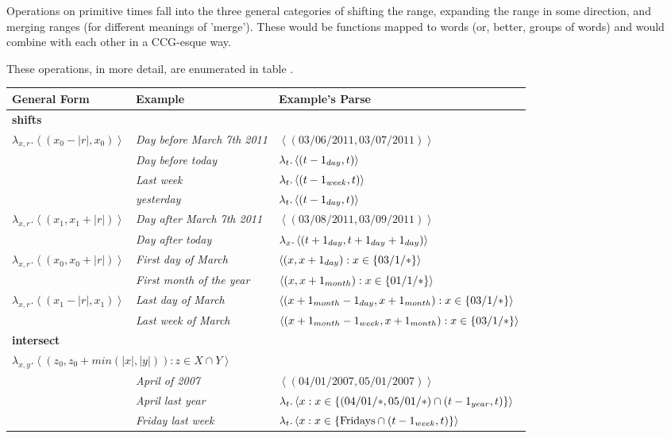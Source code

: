 \documentclass{article}
\begin{document}
Operations on primitive times fall into the three general categories
	of shifting the range, expanding the range in some direction,
	and merging ranges (for different meanings of 'merge').
These would be functions mapped to words (or, better, groups of words)
	and would combine with each other in a CCG-esque way.

These operations, in more detail, are enumerated in table .

\begin{table}
\begin{center}
\begin{tabular}{l l l}
	{\bf General Form} & {\bf Example} & {\bf Example's Parse} \\
	\hline
	\hline

	\multicolumn{3}{l}{{\bf shifts}} \\
	$\lambda_{x,r}.\left< (x_0-|r|, x_0) \right>$
		& {\em Day before March 7th 2011} 
			& $\left< (03/06/2011,03/07/2011) \right>$\\
		& {\em Day before today} 
			& $\lambda_{t}.\left< (t-1_{day},t) \right>$\\
		& {\em Last week} 
			& $\lambda_t.\left< (t-1_{week},t) \right>$ \\
		& {\em yesterday} 
			& $\lambda_t.\left< (t-1_{day},t) \right>$ \\
	$\lambda_{x,r}.\left< (x_1, x_1+|r|) \right>$
		& {\em Day after March 7th 2011} 
			& $\left< (03/08/2011,03/09/2011) \right>$\\
		& {\em Day after today} 
			& $\lambda_{x}.\left< (t+1_{day},t+1_{day}+1_{day}) \right>$\\
	
	$\lambda_{x,r}.\left< (x_0, x_0+|r|) \right>$
		& {\em First day of March} 
			& $\left< (x,x+1_{day}) : x \in \{ 03/1/* \} \right>$ \\
		& {\em First month of the year} 
			& $\left< (x,x+1_{month}) : x \in \{ 01/1/* \} \right>$ \\
	$\lambda_{x,r}.\left< (x_1-|r|, x_1) \right>$
		& {\em Last day of March} 
			& $\left< (x+1_{month}-1_{day},x+1_{month}) 
				: x \in \{ 03/1/* \} \right>$ \\
		& {\em Last week of March} 
			& $\left< (x+1_{month}-1_{week},x+1_{month}) 
				: x \in \{ 03/1/* \} \right>$ \\
	
	\multicolumn{3}{l}{{\bf intersect}} \\
	\multicolumn{3}{l}{
			$\lambda_{x,y}.\left< (z_0, z_0+min(|x|,|y|)) : z \in X \cap Y \right>$}\\
		& {\em April of 2007} 
			& $\left< (04/01/2007,05/01/2007) \right>$ \\
		& {\em April last year} 
			& $\lambda_t.\left< x 
			  : x \in \{ (04/01/*,05/01/*) \cap (t-1_{year},t) \} \right>$ \\
		& {\em Friday last week} 
			& $\lambda_t.\left< x 
			  : x \in \{ \text{Fridays} \cap (t-1_{week},t) \} \right>$ \\
	

\end{tabular}
\end{center}
\end{table}
\end{document}
